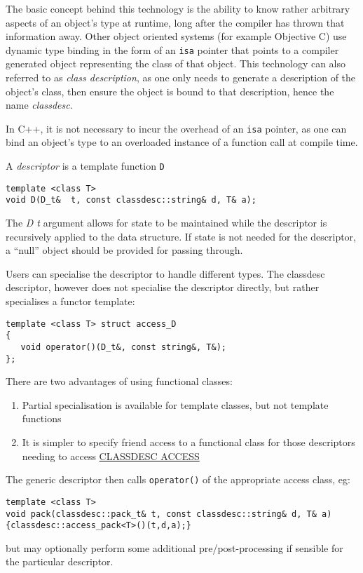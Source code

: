 \label{classdesc}

The basic concept behind this technology is the ability to know rather
arbitrary aspects of an object's type at runtime, long after the
compiler has thrown that information away. Other object oriented
systems (for example Objective C) use dynamic type binding in the form
of an {\tt isa} pointer that points to a compiler generated object
representing the class of that object. This technology can also
referred to as {\em class description}, as one only needs to generate
a description of the object's class, then ensure the object is bound
to that description, hence the name {\em classdesc}\cite{Madina-Standish01}.

In C++, it is not necessary to incur the overhead of an {\tt isa}
pointer, as one can bind an object's type to an overloaded instance of
a function call at compile time.

A {\em descriptor} is a template function \verb+D+\\
\begin{verbatim}
template <class T>
void D(D_t&  t, const classdesc::string& d, T& a);
\end{verbatim}

The {\em D t} argument allows for state to be maintained while the
descriptor is recursively applied to the data structure. If state is
not needed for the descriptor, a ``null'' object should be
provided for passing through.

Users can specialise the descriptor to handle different types. The
classdesc descriptor, however does not specialise the descriptor
directly, but rather specialises a functor template:\\
\begin{verbatim}
template <class T> struct access_D
{
   void operator()(D_t&, const string&, T&);
};
\end{verbatim}
There are two advantages of using functional classes:
\begin{enumerate}
\item Partial specialisation is available for template classes, but
  not template functions
\item It is simpler to specify friend access to a functional class for
  those descriptors needing to access 
   \hyperref{private or protected members}{(see \S}{)}{CLASSDESC ACCESS}
\end{enumerate}
The generic descriptor then calls \verb+operator()+ of the appropriate
access class, eg:
\begin{verbatim}
template <class T>
void pack(classdesc::pack_t& t, const classdesc::string& d, T& a)
{classdesc::access_pack<T>()(t,d,a);}
\end{verbatim}
but may optionally perform some additional pre/post-processing if
sensible for the particular descriptor.

